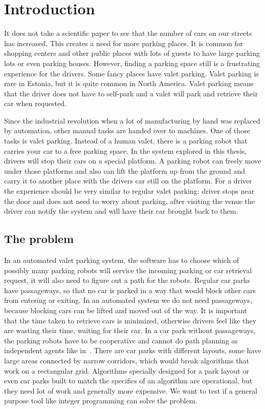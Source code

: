 \section{Introduction}
It does not take a scientific paper to see that the number of cars on our
streets has increased. This creates a need for more parking places. It is
common for shopping centers and other public places with lots of guests to have
large parking lots or even parking houses. However, finding a parking space
still is a frustrating experience for the drivers. Some fancy places have valet
parking. Valet parking is rare in Estonia, but it is quite common in North
America. Valet parking means that the driver does not have to self-park and a
valet will park and retrieve their car when requested.

Since the industrial revolution when a lot of manufacturing by hand was replaced
by automation, other manual tasks are handed over to machines. One of those
tasks is valet parking. Instead of a human valet, there is a parking robot that
carries your car to a free parking space. In the system explored in this
thesis, drivers will stop their cars on a special platform. A parking robot can
freely move under those platforms and also can lift the platform up from the
ground and carry it to another place with the drivers car still on the
platform. For a driver the experience should be very similar to regular valet
parking: driver stops near the door and does not need to worry about parking,
after visiting the venue the driver can notify the system and will have their
car brought back to them.
\subsection{The problem}
In an automated valet parking system, the software has to choose which of
possibly many parking robots will service the incoming parking or car retrieval
request, it will also need to figure out a path for the robots. Regular car
parks have passageways, so that no car is parked in a way that would block
other cars from entering or exiting. In an automated system we do not need
passageways, because blocking cars can be lifted and moved out of the way.
It is important that the time taken to retrieve cars is minimized, otherwise
drivers feel like they are wasting their time, waiting for their car. In a car
park without passageways, the parking robots have to be cooperative and cannot
do path planning as independent agents like in~\cite{wurman2008coordinating}.
There are car parks with different layouts, some have large areas connected by
narrow corridors, which would break algorithms that work on a rectangular grid.
Algorithms specially designed for a park layout or even car parks built to
match the specifics of an algorithm are operational, but they need lot of work
and generally more expensive. We want to test if a general purpose tool like
integer programming can solve the problem.

